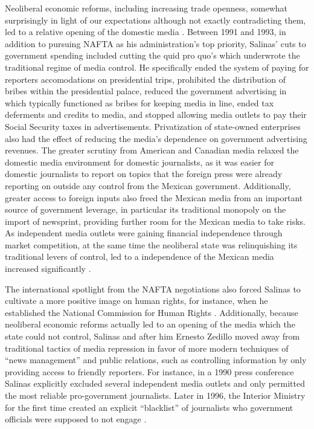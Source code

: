 \documentclass[12pt,a4paper]{article}\usepackage[]{graphicx}\usepackage[]{color}
\begin{document}
Neoliberal economic reforms, including increasing trade openness, somewhat surprisingly in light of our expectations although not exactly contradicting them, led to a relative opening of the domestic media \parencite{lawson2002building}. Between 1991 and 1993, in addition to pursuing NAFTA as his administration's top priority, Salinas' cuts to government spending included cutting the quid pro quo's which underwrote the traditional regime of media control. He specifically ended the system of paying for reporters accomodations on presidential trips, prohibited the distribution of bribes within the presidential palace, reduced the government advertising in which typically functioned as bribes for keeping media in line, ended tax deferments and credits to media, and stopped allowing media outlets to pay their Social Security taxes in advertisements. Privatization of state-owned enterprises also had the effect of reducing the media's dependence on government advertising revenues. The greater scrutiny from American and Canadian media relaxed the domestic media environment for domestic journalists, as it was easier for domestic journalists to report on topics that the foreign press were already reporting on outside any control from the Mexican government. Additionally, greater access to foreign inputs also freed the Mexican media from an important source of government leverage, in particular its traditional monopoly on the import of newsprint, providing further room for the Mexican media to take risks. As independent media outlets were gaining financial independence through market competition, at the same time the neoliberal state was relinquishing its traditional levers of control, led to a independence of the Mexican media increased significantly \parencite[76,89]{lawson2002building}.

The international spotlight from the NAFTA negotiations also forced Salinas to cultivate a more positive image on human rights, for instance, when he established the National Commission for Human Rights \parencite[107]{Dominguez:2009wd}. Additionally, because neoliberal economic reforms actually led to an opening of the media which the state could not control, Salinas and after him Ernesto Zedillo moved away from traditional tactics of media repression in favor of more modern techniques of “news management” and public relations, such as controlling information by only providing access to friendly reporters. For instance, in a 1990 press conference Salinas explicitly excluded several independent media outlets and only permitted the most reliable pro-government journalists. Later in 1996, the Interior Ministry for the first time created an explicit “blacklist” of journalists who government officials were supposed to not engage \parencite[39]{lawson2002building}.
\end{document}
